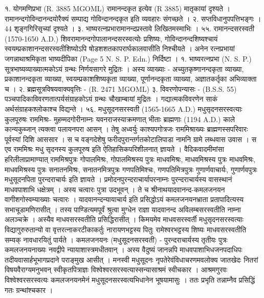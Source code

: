 १. योगमणिप्रभा (R. 3885 MGOML) रामानन्दकृत इत्येव (R 3885) मातृकायां दृश्यते । रामानन्दगोविन्दानन्दयोरैक्यं सम्पाद्य गोविन्दानन्दकृत इति व्यवहारः संगच्छते ।
२. सप्तविधानुपपत्तिभङ्गः । 44 शृङ्गगिरिसृच्यां दृश्यते । ३. भाष्यरत्नप्रभारामानन्दप्रस्तावे लिखितमस्माभिः ।
५५. रामानन्दसरस्वती (1570-1650 A.D.)
शिवरामानन्दगोपालानन्दसरस्वत्योः प्रशिष्यः, गोविन्दानन्दशिष्यश्चायं स्वयम्प्रकाशानन्दसरस्वतीशिष्योऽपि षोडशशतकापरार्घकालवासीति निश्चीयते । अनेन रत्नप्रभायां जगन्नाथाश्रमिकृता भाष्यदीपिका (Page 5 N. S. P. Edn.) निर्दिष्टा ।
१. भाष्यरत्नप्रभा (N. S. P.)
सूत्रभाष्यव्याख्यात्मकोऽयं ग्रन्थः निर्णयसागरे मुद्रितः । अस्य व्याख्याः - अच्युतकृष्णानन्दकृता व्याख्या, प्रकाशानन्दकृता व्याख्या, स्वयम्प्रकाशशिष्यकृता व्याख्या, पूर्णानन्दकृता व्याख्या, अज्ञातकर्तृका अभिव्याक्ता च ।
२. ब्रह्मसूत्रविषयवाक्यवृत्तिः - (R. 2471 MGOML)
३. विवरणोपन्यासः - (B.S.S. 55)
पञ्चपादिकाविवरणतात्पर्यसंग्राहकोऽयं ग्रन्थः चौखाम्बायां मुद्रितः । गद्यात्मकविवरणेन साकं अर्थसंग्राहकश्लोकाश्च विद्यन्ते ।
५६. मधुसूदनसरस्वती (1565-1665 A.D.)
मधुसृदनसरस्वत्याः कुलपूरुषः राममिश्रः-
मुहम्मदगोरीनाम्नः यवनराजस्याक्रमणात् भीताः ब्राह्मणाः (1194 A.D.) काले कान्यकुब्जान् त्यक्त्वा पलायनपरा आसन् । तेषु अध्वर्युः काश्यपगोत्रजः राममिश्राख्यः ब्राह्मणस्सपरिवारः पूर्वस्यां दिशि आससार । स च वङ्गदेशेषु फरीदपुरान्तर्गतकोटालिपाडा नामनि ग्रामे लब्धवास उवास । स एव राममिश्रः मधु सृदनस्य कुलपूरुष इति ऐतिहासिकपरिशीलनात् ज्ञायते । वैदिकवादमीमांसा हरिलीलाप्रामाण्यात् राममिश्रपुत्रः गोपालमिश्रः, गोपालमिश्रस्य पुत्रः माधवमिश्रः, माधवमिश्रस्य पुत्रः माधवमिश्रः, माधवमिश्रस्य पुत्रः सनातनमिश्रः, सनातनमित्रपुत्रः गणपतिमिश्चः, गणपतिमित्रपुत्रः गुणार्णवाचार्यः, गुणार्णवपुत्रः मधुसूदनपिता पुरन्दराचार्यः इति ज्ञायते ।
प्रमोदनपुरन्दराचार्यापरनाम्नः पुरन्दराचार्यस्य वासस्थानं माधवपाशाभि धक्षेत्रम् । अस्य चत्वारः पुत्रा उदभूवन् । ते च श्रीनाथयादवानन्द-कमलजनयन वागीशगोस्वम्याख्याः चत्वारः ।
यादवानन्दन्यायाचार्य इति प्रसिद्धोऽयं कमलजनयनभ्राता प्रतापादित्यस्य सभाचूडामणिरासीत् । तस्य पाण्डित्यमपूर्वं श्रुत्वा मुग्धेन राज्ञा यादवानन्द अविलम्बसरस्वतीति नाम्ना अलञ्चक्रे । अस्यैव माधवसरस्वतीति प्रसिद्धिरासीत् । किमयमेव माधवसरस्वर्ती मधुसृदनसरस्वत्याः विद्यागुरुरुतान्यो वा वृत्तरत्नाकरटीकाकर्तुः नारायणभट्टस्य पितुः रामेश्वरभट्टस्य शिष्यः माधवसरस्वतीति सम्यक् नावधारयितुं पार्यते ।
कमलजनयनः (मधुसूदनसरस्वती) -
पुरन्दराचार्यस्य तृतीयः पुत्रः कमलजनयनाख्यः नवद्वीपे न्यायाशास्त्रमधीतवान् । अस्य वैदुष्यं जानन्नपि माधवपाशाभिधजनपदाधिपः तदीयवासार्हभूभागप्रदाने पराङ्मुख आसीत् । मनस्वी मधुसूदनः नृपतेरेवंविधाचरणमवलोक्य जातखेदः नितरां विषयवैराग्यमनुभवन् स्वीकृतपित्राज्ञः विश्वेश्वरसरस्वत्यास्सन्यासाश्रमं स्वीचकार । आश्रमगुरवः विश्वेश्वरसरस्वत्यः कमलजनयनमेनं मधुसूदनसरस्वत्यभिधानेन भूषयामासुः । ततः प्रभृति तन्नाम्नैव प्रसिद्धिं गतः ग्रन्थांश्चकार ।
